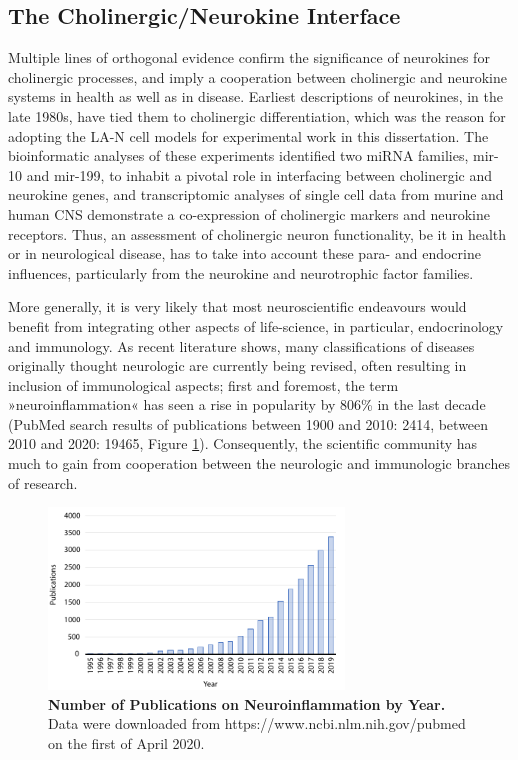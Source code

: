 \subsection{The Cholinergic/Neurokine Interface}
Multiple lines of orthogonal evidence confirm the significance of neurokines for cholinergic processes, and imply a cooperation between cholinergic and neurokine systems in health as well as in disease. Earliest descriptions of neurokines, in the late 1980s, have tied them to cholinergic differentiation, which was the reason for adopting the LA-N cell models for experimental work in this dissertation.\cite{} The bioinformatic analyses of these experiments identified two miRNA families, mir-10 and mir-199, to inhabit a pivotal role in interfacing between cholinergic and neurokine genes, and transcriptomic analyses of single cell data from murine and human CNS demonstrate a co-expression of cholinergic markers and neurokine receptors.\cite{Lobentanzer2019a} Thus, an assessment of cholinergic neuron functionality, be it in health or in neurological disease, has to take into account these para- and endocrine influences, particularly from the neurokine and neurotrophic factor families. 

More generally, it is very likely that most neuroscientific endeavours would benefit from integrating other aspects of life-science, in particular, endocrinology and immunology. As recent literature shows, many classifications of diseases originally thought neurologic are currently being revised, often resulting in inclusion of immunological aspects; first and foremost, the term »neuroinflammation« has seen a rise in popularity by 806\% in the last decade (PubMed search results of publications between 1900 and 2010: 2414, between 2010 and 2020: 19465, Figure \ref{fig:pubmed-neuro}). Consequently, the scientific community has much to gain from cooperation between the neurologic and immunologic branches of research.

\begin{figure}
\centering
\includegraphics[width=0.7\textwidth]{figures/pubmed-neuro}
\caption[Number of Publications on Neuroinflammation by Year.]{\textbf{Number of Publications on Neuroinflammation by Year.} Data were downloaded from https://www.ncbi.nlm.nih.gov/pubmed on the first of April 2020.
\label{fig:pubmed-neuro}}
\end{figure}

